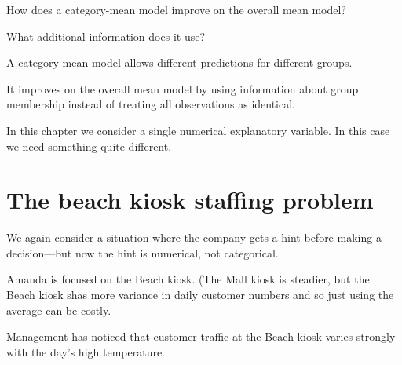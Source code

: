 \documentclass[
  12pt,
  letterpaper,
  DIV=11,
  numbers=noendperiod]{scrreprt}
\begin{document}
\begin{tcolorbox}[enhanced jigsaw, colback=white, leftrule=.75mm, toprule=.15mm, bottomtitle=1mm, breakable, coltitle=black, toptitle=1mm, title=\textcolor{quarto-callout-note-color}{\faInfo}\hspace{0.5em}{Quick Check}, opacitybacktitle=0.6, colbacktitle=quarto-callout-note-color!10!white, arc=.35mm, left=2mm, colframe=quarto-callout-note-color-frame, titlerule=0mm, rightrule=.15mm, bottomrule=.15mm, opacityback=0]

How does a category-mean model improve on the overall mean model?

What additional information does it use?

\end{tcolorbox}

\begin{tcolorbox}[enhanced jigsaw, colback=white, leftrule=.75mm, toprule=.15mm, bottomtitle=1mm, breakable, coltitle=black, toptitle=1mm, title=\textcolor{quarto-callout-note-color}{\faInfo}\hspace{0.5em}{Answer}, opacitybacktitle=0.6, colbacktitle=quarto-callout-note-color!10!white, arc=.35mm, left=2mm, colframe=quarto-callout-note-color-frame, titlerule=0mm, rightrule=.15mm, bottomrule=.15mm, opacityback=0]

A category-mean model allows different predictions for different groups.

It improves on the overall mean model by using information about group
membership instead of treating all observations as identical.

\end{tcolorbox}

In this chapter we consider a single numerical explanatory variable. In
this case we need something quite different.

\section{The beach kiosk staffing
problem}\label{the-beach-kiosk-staffing-problem}

We again consider a situation where the company gets a hint before
making a decision---but now the hint is numerical, not categorical.

Amanda is focused on the Beach kiosk. (The Mall kiosk is steadier, but
the Beach kiosk shas more variance in daily customer numbers and so just
using the average can be costly.

Management has noticed that customer traffic at the Beach kiosk varies
strongly with the day's high temperature.
\end{document}
